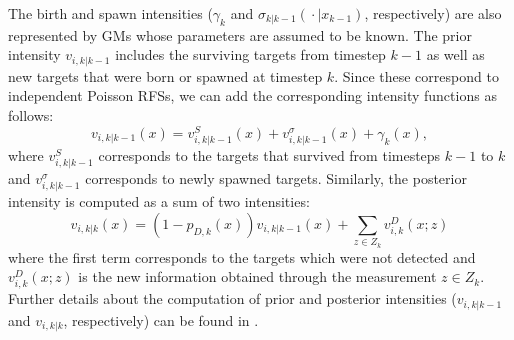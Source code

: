 The birth and spawn intensities ($\gamma_k$ and $\sigma_{k|k-1}({}\cdot{}|x_{k-1})$, respectively) are also represented by GMs whose parameters are assumed to be known. The prior intensity $v_{i,k|k-1}$ includes the surviving targets from timestep $k-1$ as well as new targets that were born or spawned at timestep $k$. Since these correspond to independent Poisson RFSs, we can add the corresponding intensity functions as follows:
\begin{equation}
    v_{i,k|k-1}(x) = v_{i,k|k-1}^S(x) + v_{i,k|k-1}^\sigma(x) + \gamma_{k}(x),
\end{equation}
where $v^S_{i,k|k-1}$ corresponds to the targets that survived from timesteps $k-1$ to $k$ and $v_{i,k|k-1}^{\sigma}$ corresponds to newly spawned targets. Similarly, the posterior intensity is computed as a sum of two intensities:
\begin{equation}
    v_{i,k|k}(x) = (1 - p_{D,k}(x)) v_{i,k|k-1}(x) + \sum_{z \in Z_{k}} v_{i,k}^D(x;z)
\end{equation}
where the first term corresponds to the targets which were not detected and $v^{D}_{i,k}(x;z)$ is the new information obtained through the measurement $z\in Z_{k}$. Further details about the computation of prior and posterior intensities ($v_{i,k|k-1}$ and $v_{i,k|k}$, respectively) can be found in \cite{vo2006gmphd}. 

